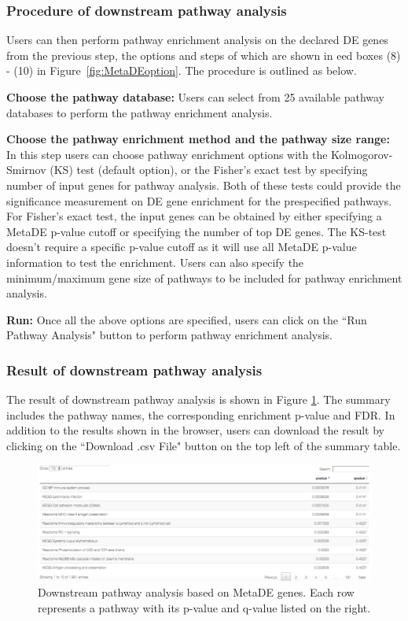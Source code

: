 \subsubsection{Procedure of downstream pathway analysis}
Users can then perform pathway enrichment analysis on the declared DE genes from the previous step, 
the options and steps of which are shown in {\color{red} eed boxes (8) - (10)} in Figure~\ref{fig:MetaDEoption}.
The procedure is outlined as below.

\begin{steps}
\item \textbf{Choose the pathway database:}
Users can select from 25 available pathway databases to perform the pathway enrichment analysis. 

\item \textbf{Choose the pathway enrichment method and the pathway size range:}
In this step users can choose pathway enrichment options with the Kolmogorov-Smirnov (KS) test (default option),
or the Fisher's exact test by specifying number of input genes for pathway analysis.
Both of these tests could provide the significance measurement on DE gene enrichment for the prespecified pathways.
For Fisher's exact test, the input genes can be obtained by either specifying a MetaDE p-value cutoff 
or specifying the number of top DE genes.
The KS-test doesn't require a specific p-value cutoff as it will use all MetaDE p-value information to test the enrichment.
Users can also specify the minimum/maximum gene size of pathways to be included for pathway enrichment analysis.

\item \textbf{Run:}
Once all the above options are specified, users can click on the ``Run Pathway Analysis" button to perform pathway enrichment analysis.

\end{steps}


\subsubsection{Result of downstream pathway analysis}

The result of downstream pathway analysis is shown in Figure \ref{fig:MetaDEresult2}. 
The summary includes the pathway names, the corresponding enrichment p-value and FDR. 
In addition to the results shown in the browser, 
users can download the result by clicking on the ``Download .csv File" button on the top left of the summary table. 

\begin{figure}[H]
\begin{center}
\includegraphics[scale=0.5]{./figure/metaDE/MetaDE_pathway.pdf}
\caption{Downstream pathway analysis based on MetaDE genes.
Each row represents a pathway with its p-value and q-value listed on the right.
}
\label{fig:MetaDEresult2}
\end{center}
\end{figure}



